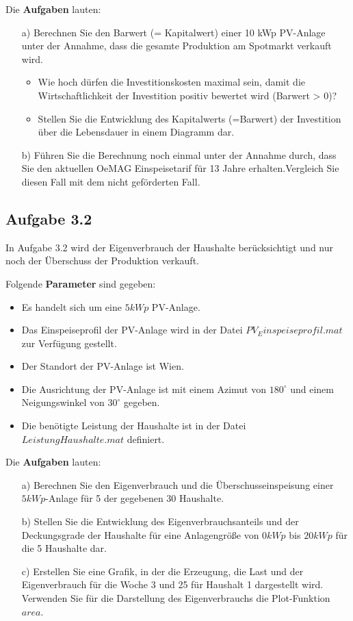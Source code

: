 \documentclass[a4paper,12pt]{article}
\begin{document}
	Die \textbf{Aufgaben} lauten:
	\begin{itemize}
		\item[a)] Berechnen Sie den Barwert (= Kapitalwert) einer 10 kWp PV-Anlage unter der Annahme, dass die gesamte Produktion am Spotmarkt verkauft wird.
		\begin{itemize}
			\item Wie hoch dürfen die Investitionskosten maximal sein, damit die Wirtschaftlichkeit der Investition positiv bewertet wird (Barwert > 0)?
			\item Stellen Sie die Entwicklung des Kapitalwerts (=Barwert) der Investition über die Lebensdauer in einem Diagramm dar.
		\end{itemize}
		\item[b)] Führen Sie die Berechnung noch einmal unter der Annahme durch, dass Sie den aktuellen OeMAG Einspeisetarif für 13 Jahre erhalten.\newline Vergleich Sie diesen Fall mit dem nicht geförderten Fall.
	\end{itemize}
	\subsection{Aufgabe 3.2}
	In Aufgabe 3.2 wird der Eigenverbrauch der Haushalte berücksichtigt und nur noch der Überschuss der Produktion verkauft.\\ \par
	\noindent Folgende \textbf{Parameter} sind gegeben:
	\begin{itemize}
		\item Es handelt sich um eine $5kWp$ PV-Anlage.
		\item Das Einspeiseprofil der PV-Anlage wird in der Datei $PV_Einspeiseprofil.mat$ zur Verfügung gestellt.
		\item Der Standort der PV-Anlage ist Wien.
		\item Die Ausrichtung der PV-Anlage ist mit einem Azimut von $180^{\circ}$ und einem Neigungswinkel von $30^{\circ}$ gegeben.
		\item Die benötigte Leistung der Haushalte ist in der Datei $LeistungHaushalte.mat$ definiert.
	\end{itemize}
	Die \textbf{Aufgaben} lauten:
	\begin{itemize}
		\item[a)] Berechnen Sie den Eigenverbrauch und die Überschusseinspeisung einer $5kWp$-Anlage für 5 der gegebenen 30 Haushalte.
		\item[b)] Stellen Sie die Entwicklung des Eigenverbrauchsanteils und der Deckungsgrade der Haushalte für eine Anlagengröße von $0kWp$ bis $20kWp$ für die 5 Haushalte dar.
		\item[c)] Erstellen Sie eine Grafik, in der die Erzeugung, die Last und der Eigenverbrauch für die Woche 3 und 25 für Haushalt 1 dargestellt wird. Verwenden Sie für die Darstellung des Eigenverbrauchs die Plot-Funktion $area$.
	\end{itemize}
\end{document}
